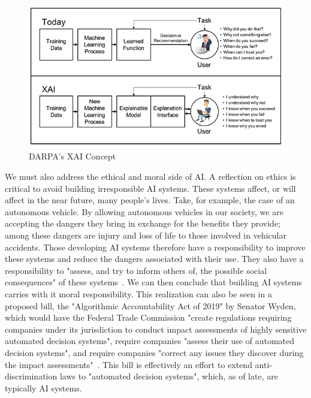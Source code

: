 \documentclass[]{report}
\begin{document}
\begin{figure}[h]
    \centering
    \includegraphics[scale=1.1]{figures/xai-figure2.png}
    \caption[]{DARPA's XAI Concept~\protect\cite{gunningXAIProgram}}
    \label{fig:darpa_xai}
\end{figure}

We must also address the ethical and moral side of AI. A reflection on ethics is critical to avoid
building irresponsible AI systems. These systems affect, or will affect in the near future, many
people's lives. Take, for example, the case of an autonomous vehicle. By allowing autonomous
vehicles in our society, we are accepting the dangers they bring in exchange for the benefits they
provide; among these dangers are injury and loss of life to those involved in vehicular accidents.
Those developing AI systems therefore have a responsibility to improve these systems and reduce the
dangers associated with their use. They also have a responsibility to "assess, and try to inform
others of, the possible social consequences" of these systems~\cite{patrick2017robot}. We can then
conclude that building AI systems carries with it moral responsibility. This realization can also be
seen in a proposed bill, the "Algorithmic Accountability Act of 2019" by Senator Wyden, which would
have the Federal Trade Commission "create regulations requiring companies under its jurisdiction to
conduct impact assessments of highly sensitive automated decision systems", require companies
"assess their use of automated decision systems", and require companies "correct any issues they
discover during the impact assessments"~\cite{wyden2019bill}. This bill is effectively an effort to
extend anti-discrimination laws to "automated decision systems", which, as of late, are typically AI
systems.
\end{document}
